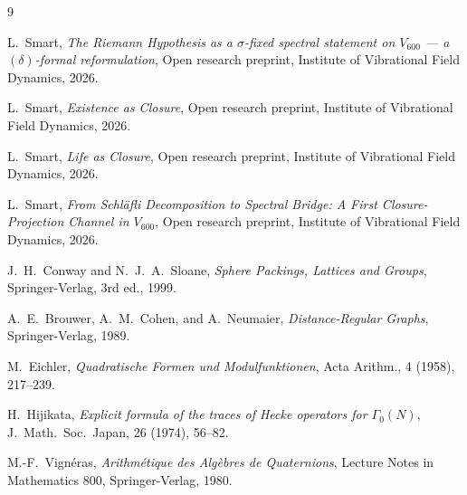 \documentclass[11pt,a4paper]{article}
\theoremstyle{definition}
\theoremstyle{remark}
\begin{document}
\bigskip


\begin{thebibliography}{9}

L.~Smart,
\emph{The Riemann Hypothesis as a $\sigma$-fixed spectral statement on $V_{600}$ — a $(\delta)$-formal reformulation},
Open research preprint, Institute of Vibrational Field Dynamics, 2026.

L.~Smart,
\emph{Existence as Closure},
Open research preprint, Institute of Vibrational Field Dynamics, 2026.

L.~Smart,
\emph{Life as Closure},
Open research preprint, Institute of Vibrational Field Dynamics, 2026.

L.~Smart,
\emph{From Schl\"afli Decomposition to Spectral Bridge: A First Closure-Projection Channel in $V_{600}$},
Open research preprint, Institute of Vibrational Field Dynamics, 2026.

J.~H.~Conway and N.~J.~A.~Sloane,
\emph{Sphere Packings, Lattices and Groups},
Springer-Verlag, 3rd ed., 1999.

A.~E.~Brouwer, A.~M.~Cohen, and A.~Neumaier,
\emph{Distance-Regular Graphs},
Springer-Verlag, 1989.

M.~Eichler,
\emph{Quadratische Formen und Modulfunktionen},
Acta Arithm., 4 (1958), 217--239.

H.~Hijikata,
\emph{Explicit formula of the traces of Hecke operators for $\Gamma_0(N)$},
J.~Math.~Soc.~Japan, 26 (1974), 56--82.

M.-F.~Vign\'eras,
\emph{Arithm\'etique des Alg\`ebres de Quaternions},
Lecture Notes in Mathematics 800, Springer-Verlag, 1980.

\end{thebibliography}
\end{document}

